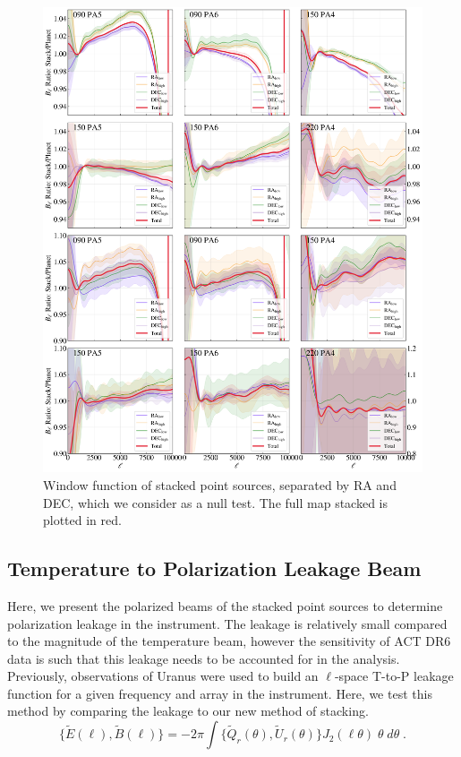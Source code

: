 \begin{figure}
    \centering
    \includegraphics[width=.95\textwidth]{Figures/Bells_ratio_planet.png}
    \caption{Window function of stacked point sources, separated by RA and DEC, which we consider as a null test.  The full map stacked is plotted in red.}
    \label{fig:bells}
\end{figure}

\subsection{Temperature to Polarization Leakage Beam}
\label{subsec:polbeam}

Here, we present the polarized beams of the stacked point sources to determine polarization leakage in the instrument.  The leakage is relatively small compared to the magnitude of the temperature beam, however the sensitivity of ACT DR6 data is such that this leakage needs to be accounted for in the analysis.  Previously, observations of Uranus were used to build an $\ell$-space T-to-P leakage function for a given frequency and array in the instrument.  Here, we test this method by comparing the leakage to our new method of stacking.
\begin{equation}
\label{eq:trans_e_b}
    \{\tilde{E}(\ell), \tilde{B}(\ell)\} = -2\pi\int \{\tilde{Q}_r(\theta),\tilde{U}_r(\theta) \} J_2(\ell\theta)\;\theta\;d\theta \; .
\end{equation}

